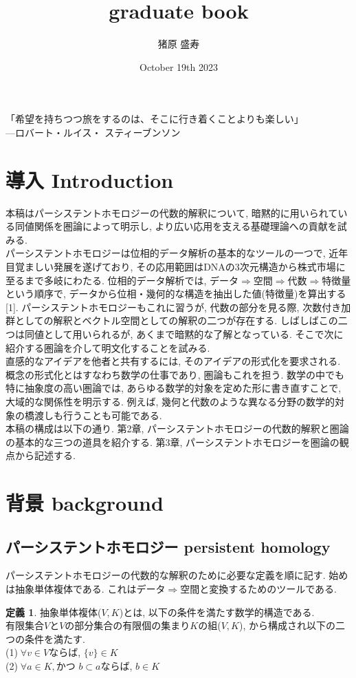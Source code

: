\documentclass[a4paper]{jsarticle}
\title{graduate book}
\author{猪原 盛寿}
\date{October 19th 2023}
\theoremstyle{definition}
\newtheorem{dfn}{定義}[section]
\begin{document}
\Large
\maketitle
「希望を持ちつつ旅をするのは、そこに行き着くことよりも楽しい」\\
---ロバート・ルイス・ スティーブンソン
\section{導入 Introduction}
本稿はパーシステントホモロジーの代数的解釈について, 暗黙的に用いられている同値関係を圏論によって明示し, より広い応用を支える基礎理論への貢献を試みる. \\

パーシステントホモロジーは位相的データ解析の基本的なツールの一つで, 近年目覚ましい発展を遂げており, その応用範囲はDNAの3次元構造から株式市場に至るまで多岐にわたる. 位相的データ解析では, データ$\Rightarrow$空間$\Rightarrow$代数$\Rightarrow$特徴量という順序で, データから位相・幾何的な構造を抽出した値(特徴量)を算出する[1]. パーシステントホモロジーもこれに習うが, 代数の部分を見る際, 次数付き加群としての解釈とベクトル空間としての解釈の二つが存在する. しばしばこの二つは同値として用いられるが, あくまで暗黙的な了解となっている. そこで次に紹介する圏論を介して明文化することを試みる. \\

直感的なアイデアを他者と共有するには, そのアイデアの形式化を要求される. 概念の形式化とはすなわち数学の仕事であり, 圏論もこれを担う. 数学の中でも特に抽象度の高い圏論では, あらゆる数学的対象を定めた形に書き直すことで, 大域的な関係性を明示する. 例えば, 幾何と代数のような異なる分野の数学的対象の橋渡しも行うことも可能である. \\

本稿の構成は以下の通り. 第2章, パーシステントホモロジーの代数的解釈と圏論の基本的な三つの道具を紹介する. 第3章, パーシステントホモロジーを圏論の観点から記述する. 
\section{背景 background}
\subsection{パーシステントホモロジー persistent homology}
パーシステントホモロジーの代数的な解釈のために必要な定義を順に記す. 始めは抽象単体複体である. これはデータ$\Rightarrow$空間と変換するためのツールである. 
\begin{dfn}
    抽象単体複体($V,K$)とは, 以下の条件を満たす数学的構造である.\\
    有限集合$V$と$V$の部分集合の有限個の集まり$K$の組($V,K$), から構成され以下の二つの条件を満たす.\\
    \noindent
    (1)$\; \forall v\in V$ならば, $\{v\}\in K$ \\
    (2)$\; \forall a\in K,$かつ $b\subset a$ならば, $b\in K$
\end{dfn}
\end{document}
